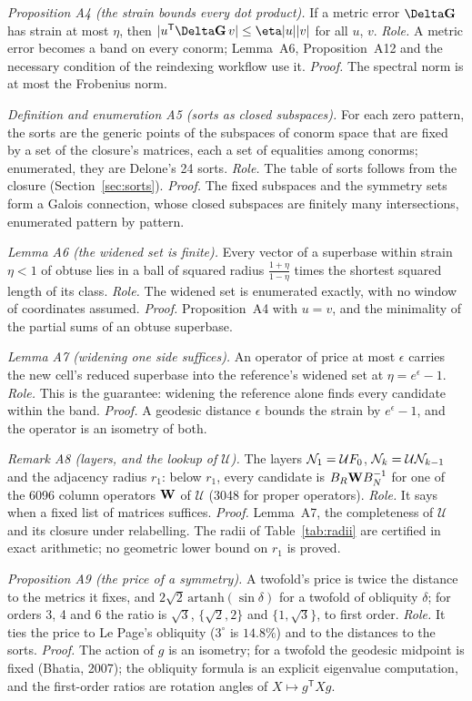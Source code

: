 \emph{Proposition A4 (the strain bounds every dot product).} If a metric error $\Delta\Gmet$ has strain at most $\eta$, then $|u^{\mathsf T}\Delta\Gmet\,v|\le\eta|u||v|$ for all $u$, $v$. \emph{Role.} A metric error becomes a band on every conorm; Lemma~A6, Proposition~A12 and the necessary condition of the reindexing workflow use it. \emph{Proof.} The spectral norm is at most the Frobenius norm.

\emph{Definition and enumeration A5 (sorts as closed subspaces).} For each zero pattern, the sorts are the generic points of the subspaces of conorm space that are fixed by a set of the closure's matrices, each a set of equalities among conorms; enumerated, they are Delone's 24 sorts. \emph{Role.} The table of sorts follows from the closure (Section~\ref{sec:sorts}). \emph{Proof.} The fixed subspaces and the symmetry sets form a Galois connection, whose closed subspaces are finitely many intersections, enumerated pattern by pattern.

\emph{Lemma A6 (the widened set is finite).} Every vector of a superbase within strain $\eta<1$ of obtuse lies in a ball of squared radius $\frac{1+\eta}{1-\eta}$ times the shortest squared length of its class. \emph{Role.} The widened set is enumerated exactly, with no window of coordinates assumed. \emph{Proof.} Proposition~A4 with $u=v$, and the minimality of the partial sums of an obtuse superbase.

\emph{Lemma A7 (widening one side suffices).} An operator of price at most $\epsilon$ carries the new cell's reduced superbase into the reference's widened set at $\eta=e^\epsilon-1$. \emph{Role.} This is the guarantee: widening the reference alone finds every candidate within the band. \emph{Proof.} A geodesic distance $\epsilon$ bounds the strain by $e^\epsilon-1$, and the operator is an isometry of both.

\emph{Remark A8 (layers, and the lookup of $\mathcal U$).} The layers $\mathcal{N}_1=\mathcal UF_0$, $\mathcal{N}_k=\mathcal U\mathcal{N}_{k-1}$ and the adjacency radius $r_1$: below $r_1$, every candidate is $B_R\Wop B_N^{-1}$ for one of the 6096 column operators $\Wop$ of $\mathcal U$ (3048 for proper operators). \emph{Role.} It says when a fixed list of matrices suffices. \emph{Proof.} Lemma~A7, the completeness of $\mathcal U$ and its closure under relabelling. The radii of Table~\ref{tab:radii} are certified in exact arithmetic; no geometric lower bound on $r_1$ is proved.

\emph{Proposition A9 (the price of a symmetry).} A twofold's price is twice the distance to the metrics it fixes, and $2\sqrt2\,\mathrm{artanh}(\sin\delta)$ for a twofold of obliquity $\delta$; for orders 3, 4 and 6 the ratio is $\sqrt3$, $\{\sqrt2,2\}$ and $\{1,\sqrt3\}$, to first order. \emph{Role.} It ties the price to Le Page's obliquity ($3^\circ$ is $14.8\%$) and to the distances to the sorts. \emph{Proof.} The action of $g$ is an isometry; for a twofold the geodesic midpoint is fixed (Bhatia, 2007); the obliquity formula is an explicit eigenvalue computation, and the first-order ratios are rotation angles of $X\mapsto g^{\mathsf T}Xg$.

